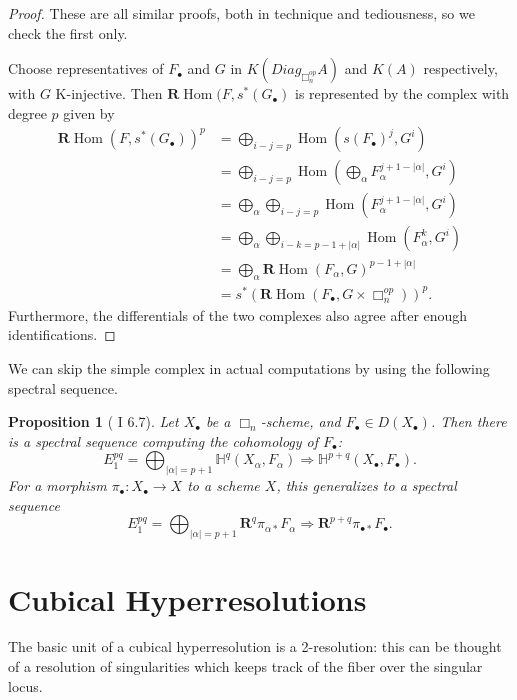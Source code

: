 \documentclass[proquest]{uwthesis}[2014/11/13]
\newtheorem{prop}[theorem]{Proposition}
\theoremstyle{definition}
\DeclareMathOperator{\Hom}{Hom}
\newcommand{\HH}{\mathbb{H}}
\newcommand{\bR}{\textbf{R}}
\begin{document}
\begin{proof}
	These are all similar proofs, both in technique and tediousness, so we check the first only.
	
	Choose representatives of $F_\bullet$ and $G$ in $K(Diag_{\Box_n^{op}} A)$ and $K(A)$ respectively, with $G$ K-injective.
	Then $\bR \Hom(F, s^* (G_\bullet)$ is represented by the complex with degree $p$ given by
	\begin{align*}
		\bR \Hom(F, s^* (G_\bullet))^p &= \bigoplus_{i-j = p} \Hom(s(F_\bullet)^j, G^i) \\
		&= \bigoplus_{i-j = p} \Hom(\bigoplus_\alpha F_\alpha^{j + 1 - |\alpha|}, G^i) \\
		&= \bigoplus_\alpha \bigoplus_{i-j = p} \Hom(F_\alpha^{j + 1 - |\alpha|}, G^i) \\
		&= \bigoplus_\alpha \bigoplus_{i-k = p - 1 + |\alpha|} \Hom(F_\alpha^k, G^i) \\
		&= \bigoplus_\alpha \bR \Hom(F_\alpha, G)^{p-1+|\alpha|} \\
		&= s^* (\bR \Hom(F_\bullet, G \times \Box_n^{op}))^p.
	\end{align*}
	Furthermore, the differentials of the two complexes also agree after enough identifications.
\end{proof}

We can skip the simple complex in actual computations by using the following spectral sequence.

\begin{prop}[\cite{Guillen1988} I 6.7]
	\label{prp:cubicalcohospecseq}
	Let $X_\bullet$ be a $\Box_n$-scheme, and $F_\bullet \in D(X_\bullet)$.
	Then there is a spectral sequence computing the cohomology of $F_\bullet$:
	\[
	E_1^{pq} = \bigoplus_{|\alpha| = p + 1} \HH^q(X_\alpha, F_\alpha) \Rightarrow \HH^{p+q}(X_\bullet, F_\bullet).
	\]
	For a morphism $\pi_\bullet : X_\bullet \rightarrow X$ to a scheme $X$, this generalizes to a spectral sequence
	\[
	E_1^{pq} = \bigoplus_{|\alpha| = p + 1} \bR^q \pi_{\alpha *}F_\alpha \Rightarrow \bR^{p+q} \pi_{\bullet *} F_\bullet.
	\]
\end{prop}

\section{Cubical Hyperresolutions}

The basic unit of a cubical hyperresolution is a 2-resolution: this can be thought of a resolution of singularities which keeps track of the fiber over the singular locus.
\end{document}
